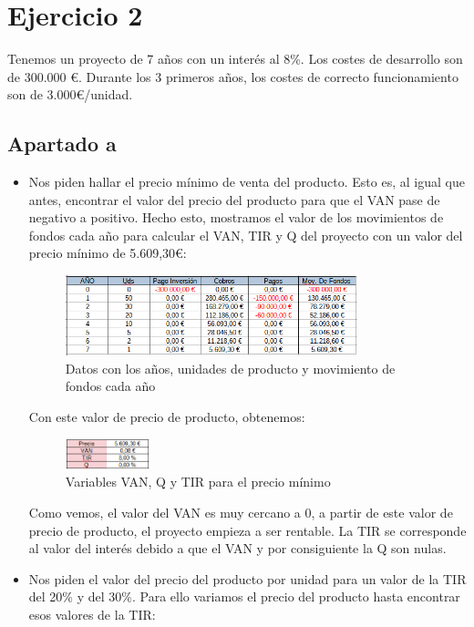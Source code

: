 \documentclass[11pt,letterpaper,onecolumn]{article}
\begin{document}
\section{Ejercicio 2}%
\label{sec:Ejercicio 2}

 Tenemos un proyecto de 7 años con un interés al 8\%. Los costes de desarrollo son de 300.000 €. Durante los 3 primeros años, los costes de correcto funcionamiento son de 3.000€/unidad. 
 \subsection{Apartado a}
\begin{itemize}
\item 
	Nos piden hallar el precio mínimo de venta del producto. Esto es, al igual que antes, encontrar el valor del precio del producto para que el VAN pase de negativo a positivo. Hecho esto, mostramos el valor de los movimientos de fondos cada año para calcular el VAN, TIR y Q del proyecto con un valor del precio mínimo de 5.609,30€:
  \begin{figure}[H]
 	\centering
	\includegraphics[width=0.8\textwidth]{imagen/ej2a_1.PNG}
	\caption{Datos con los años, unidades de producto y movimiento de fondos cada año}
 	\label{fig:2a1}
 \end{figure}
 Con este valor de precio de producto, obtenemos:
 \begin{figure}[H]
 	\centering
	\includegraphics[width=0.23\textwidth]{imagen/ej2a_1_van.PNG}
	\caption{Variables VAN, Q y TIR para el precio mínimo}
 	\label{fig:2}
 \end{figure}
 Como vemos, el valor del VAN es muy cercano a 0, a partir de este valor de precio de producto, el proyecto empieza a ser rentable. La TIR se corresponde al valor del interés debido a que el VAN y por consiguiente la Q son nulas.
 \item Nos piden el valor del precio del producto por unidad para un valor de la TIR del 20\% y del 30\%. Para ello variamos el precio del producto hasta encontrar esos valores de la TIR:

\end{itemize}
\end{document}
